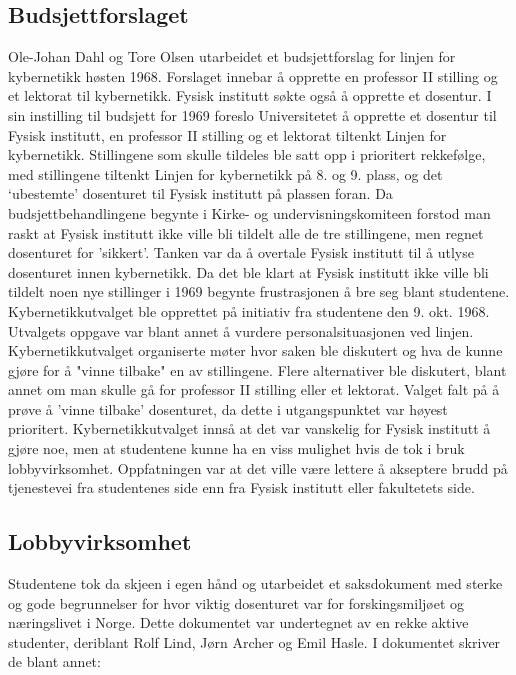 \documentclass[../main.tex]{subfiles}
\begin{document}
\subsection{Budsjettforslaget}
Ole-Johan Dahl og Tore Olsen utarbeidet et budsjettforslag for linjen for kybernetikk høsten 1968. Forslaget innebar å opprette en professor II stilling og et lektorat til kybernetikk. Fysisk institutt søkte også å opprette et dosentur. I sin instilling til budsjett for 1969 foreslo Universitetet å opprette et dosentur til Fysisk institutt, en professor II stilling og et lektorat tiltenkt Linjen for kybernetikk. Stillingene som skulle tildeles ble satt opp i prioritert rekkefølge, med stillingene tiltenkt Linjen for kybernetikk på 8. og 9. plass, og det `ubestemte' dosenturet til Fysisk institutt på plassen foran. Da budsjettbehandlingene begynte i Kirke- og undervisningskomiteen forstod man raskt at Fysisk institutt ikke ville bli tildelt alle de tre stillingene, men regnet dosenturet for 'sikkert'. Tanken var da å overtale Fysisk institutt til å utlyse dosenturet innen kybernetikk.
Da det ble klart at Fysisk institutt ikke ville bli tildelt noen nye stillinger i 1969 begynte frustrasjonen å bre seg blant studentene. Kybernetikkutvalget ble opprettet på initiativ fra studentene den 9. okt. 1968. Utvalgets oppgave var blant annet å vurdere personalsituasjonen ved linjen. Kybernetikkutvalget organiserte møter hvor saken ble diskutert og hva de kunne gjøre for å "vinne tilbake" en av stillingene. Flere alternativer ble diskutert, blant annet om man skulle gå for professor II stilling eller et lektorat. Valget falt på å prøve å 'vinne tilbake' dosenturet, da dette i utgangspunktet var høyest prioritert. Kybernetikkutvalget innså at det var vanskelig for Fysisk institutt å gjøre noe, men at studentene kunne ha en viss mulighet hvis de tok i bruk lobbyvirksomhet. Oppfatningen var at det ville være lettere å akseptere brudd på tjenestevei fra studentenes side enn fra Fysisk institutt eller fakultetets side.

\subsection{Lobbyvirksomhet}
Studentene tok da skjeen i egen hånd og utarbeidet et saksdokument med sterke og gode begrunnelser for hvor viktig dosenturet var for forskingsmiljøet og næringslivet i Norge. Dette dokumentet var undertegnet av en rekke aktive studenter, deriblant Rolf Lind, Jørn Archer og Emil Hasle. I dokumentet skriver de blant annet:
\end{document}
